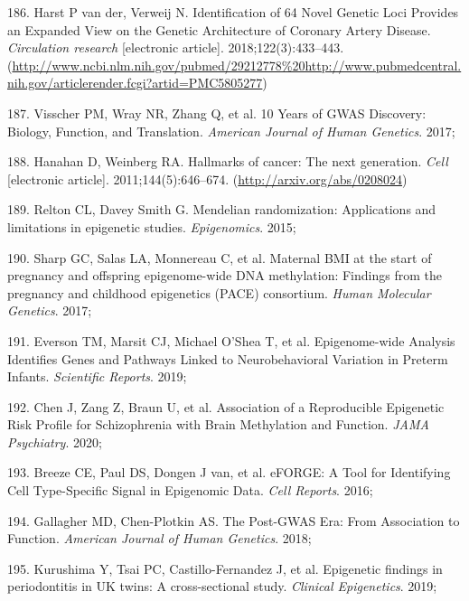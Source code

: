 \documentclass[11pt,oneside]{bristolthesis}
\newenvironment{cslreferences}%
  {}%
  {\par}
\begin{document}
\begin{cslreferences}
\leavevmode\hypertarget{ref-VanderHarst2018}{}%
186. Harst P van der, Verweij N. Identification of 64 Novel Genetic Loci Provides an Expanded View on the Genetic Architecture of Coronary Artery Disease. \emph{Circulation research} {[}electronic article{]}. 2018;122(3):433--443. (\url{http://www.ncbi.nlm.nih.gov/pubmed/29212778\%20http://www.pubmedcentral.nih.gov/articlerender.fcgi?artid=PMC5805277})

\leavevmode\hypertarget{ref-Visscher2017}{}%
187. Visscher PM, Wray NR, Zhang Q, et al. 10 Years of GWAS Discovery: Biology, Function, and Translation. \emph{American Journal of Human Genetics}. 2017;

\leavevmode\hypertarget{ref-Hanahan2011}{}%
188. Hanahan D, Weinberg RA. Hallmarks of cancer: The next generation. \emph{Cell} {[}electronic article{]}. 2011;144(5):646--674. (\url{http://arxiv.org/abs/0208024})

\leavevmode\hypertarget{ref-Relton2015}{}%
189. Relton CL, Davey Smith G. Mendelian randomization: Applications and limitations in epigenetic studies. \emph{Epigenomics}. 2015;

\leavevmode\hypertarget{ref-Sharp2017}{}%
190. Sharp GC, Salas LA, Monnereau C, et al. Maternal BMI at the start of pregnancy and offspring epigenome-wide DNA methylation: Findings from the pregnancy and childhood epigenetics (PACE) consortium. \emph{Human Molecular Genetics}. 2017;

\leavevmode\hypertarget{ref-Everson2019}{}%
191. Everson TM, Marsit CJ, Michael O'Shea T, et al. Epigenome-wide Analysis Identifies Genes and Pathways Linked to Neurobehavioral Variation in Preterm Infants. \emph{Scientific Reports}. 2019;

\leavevmode\hypertarget{ref-Chen2020}{}%
192. Chen J, Zang Z, Braun U, et al. Association of a Reproducible Epigenetic Risk Profile for Schizophrenia with Brain Methylation and Function. \emph{JAMA Psychiatry}. 2020;

\leavevmode\hypertarget{ref-Breeze2016}{}%
193. Breeze CE, Paul DS, Dongen J van, et al. eFORGE: A Tool for Identifying Cell Type-Specific Signal in Epigenomic Data. \emph{Cell Reports}. 2016;

\leavevmode\hypertarget{ref-Gallagher2018}{}%
194. Gallagher MD, Chen-Plotkin AS. The Post-GWAS Era: From Association to Function. \emph{American Journal of Human Genetics}. 2018;

\leavevmode\hypertarget{ref-Kurushima2019}{}%
195. Kurushima Y, Tsai PC, Castillo-Fernandez J, et al. Epigenetic findings in periodontitis in UK twins: A cross-sectional study. \emph{Clinical Epigenetics}. 2019;


\end{cslreferences}
\end{document}
